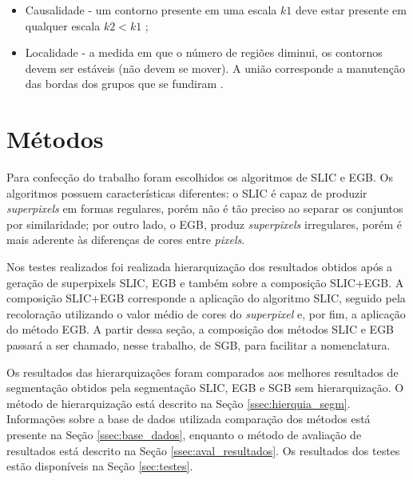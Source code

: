 \begin{document}
\begin{itemize}
 \item Causalidade - um contorno presente em uma escala $k1$ deve estar presente em qualquer escala $k2 < k1$ \cite{SILVIO_ZENILTON};
 \item Localidade - a medida em que o número de regiões diminui, os contornos devem ser estáveis (não devem se mover). A união corresponde a manutenção das bordas dos grupos que se fundiram \cite{SILVIO_ZENILTON}.
\end{itemize}


\section{Métodos} \label{sec:mat_metodos}

Para confecção do trabalho foram escolhidos os algoritmos de SLIC e EGB. Os algoritmos possuem características diferentes: o SLIC é capaz de produzir \textit{superpixels} em formas regulares, porém não é tão preciso ao separar os conjuntos por similaridade; por outro lado, o EGB, produz \textit{superpixels} irregulares, porém é mais aderente às diferenças de cores entre \textit{pixels}.

Nos testes realizados foi realizada hierarquização dos resultados obtidos após a geração de superpixels SLIC, EGB e também sobre a composição SLIC+EGB. A composição SLIC+EGB corresponde a aplicação do algoritmo SLIC, seguido pela recoloração utilizando o valor médio de cores do \textit{superpixel} e, por fim, a aplicação do método EGB. A partir dessa seção, a composição dos métodos SLIC e EGB passará a ser chamado, nesse trabalho, de SGB, para facilitar a nomenclatura.

Os resultados das hierarquizações foram comparados aos melhores resultados de segmentação obtidos pela segmentação SLIC, EGB e SGB sem hierarquização. O método de hierarquização está descrito na Seção \ref{ssec:hierquia_segm}. Informações sobre a base de dados utilizada comparação dos métodos está presente na Seção \ref{ssec:base_dados}, enquanto o método de avaliação de resultados está descrito na Seção \ref{ssec:aval_resultados}. Os resultados dos testes estão disponíveis na Seção \ref{sec:testes}.

\end{document}
